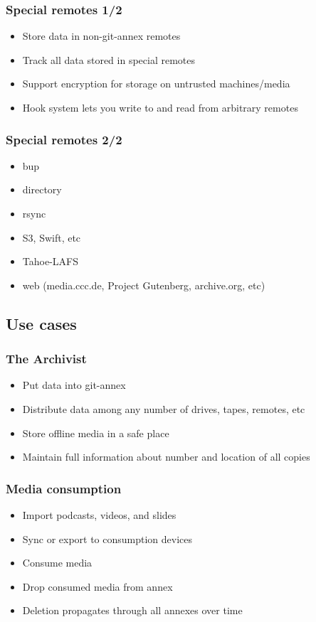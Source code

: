 \documentclass[t]{beamer}
\begin{document}
\begin{frame}
	\frametitle{Special remotes 1/2}
	\begin{itemize}
		\item Store data in non-git-annex remotes
		\item Track all data stored in special remotes
		\item Support encryption for storage on untrusted machines/media
		\item Hook system lets you write to and read from arbitrary remotes
	\end{itemize}
\end{frame}

\begin{frame}
	\frametitle{Special remotes 2/2}
	\begin{itemize}
		\item bup
		\item directory
		\item rsync
		\item S3, Swift, etc
		\item Tahoe-LAFS
		\item web (media.ccc.de, Project Gutenberg, archive.org, etc)
	\end{itemize}
\end{frame}


\subsection{Use cases}

\begin{frame}
	\frametitle{The Archivist}
	\begin{itemize}
		\item Put data into git-annex
		\item Distribute data among any number of drives, tapes, remotes, etc
		\item Store offline media in a safe place
		\item Maintain full information about number and location of all copies
	\end{itemize}
\end{frame}

\begin{frame}
	\frametitle{Media consumption}
	\begin{itemize}
		\item Import podcasts, videos, and slides
		\item Sync or export to consumption devices
		\item Consume media
		\item Drop consumed media from annex
		\item Deletion propagates through all annexes over time
	\end{itemize}
\end{frame}
\end{document}
